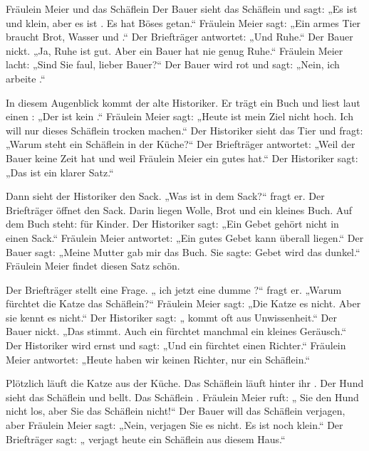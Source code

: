 \documentclass[12pt]{nextbook}
\begin{document}
\begin{readersection}{Fräulein Meier und das Schäflein}
Der Bauer sieht das Schäflein und sagt: „Es ist  und klein, aber es ist . Es hat  Böses getan.“ Fräulein Meier sagt: „Ein armes Tier braucht Brot, Wasser und .“ Der Briefträger antwortet: „Und  Ruhe.“ Der Bauer nickt. „Ja, Ruhe ist gut. Aber ein  Bauer hat nie genug Ruhe.“ Fräulein Meier lacht: „Sind Sie faul, lieber Bauer?“ Der Bauer wird rot und sagt: „Nein, ich arbeite .“

In diesem Augenblick kommt der alte Historiker. Er trägt ein Buch und liest laut einen : „Der  ist kein   .“ Fräulein Meier sagt: „Heute ist mein Ziel nicht hoch. Ich will nur dieses Schäflein trocken machen.“ Der Historiker sieht das Tier und fragt: „Warum steht ein Schäflein in der Küche?“ Der Briefträger antwortet: „Weil der Bauer keine Zeit hat und weil Fräulein Meier ein gutes  hat.“ Der Historiker sagt: „Das ist ein klarer Satz.“

Dann sieht der Historiker den Sack. „Was ist in dem Sack?“ fragt er. Der Briefträger öffnet den Sack. Darin liegen Wolle, Brot und ein kleines Buch. Auf dem Buch steht:  für Kinder. Der Historiker sagt: „Ein Gebet gehört nicht in einen Sack.“ Fräulein Meier antwortet: „Ein gutes Gebet kann überall liegen.“ Der Bauer sagt: „Meine Mutter gab mir das Buch. Sie sagte:  Gebet wird das  dunkel.“ Fräulein Meier findet diesen Satz schön.

Der Briefträger stellt eine Frage. „ ich jetzt eine dumme ?“ fragt er. „Warum fürchtet die Katze das Schäflein?“ Fräulein Meier sagt: „Die Katze  es nicht. Aber sie kennt es nicht.“ Der Historiker sagt: „ kommt oft aus Unwissenheit.“ Der Bauer nickt. „Das stimmt. Auch ein  fürchtet manchmal ein kleines Geräusch.“ Der Historiker wird ernst und sagt: „Und ein  fürchtet einen Richter.“ Fräulein Meier antwortet: „Heute haben wir keinen Richter, nur ein Schäflein.“

Plötzlich läuft die Katze aus der Küche. Das Schäflein läuft hinter ihr . Der Hund sieht das Schäflein und bellt. Das Schäflein . Fräulein Meier ruft: „ Sie den Hund nicht los, aber  Sie das Schäflein nicht!“ Der Bauer will das Schäflein verjagen, aber Fräulein Meier sagt: „Nein, verjagen Sie es nicht. Es ist noch klein.“ Der Briefträger sagt: „ verjagt heute ein Schäflein aus diesem Haus.“


\end{readersection}
\end{document}
